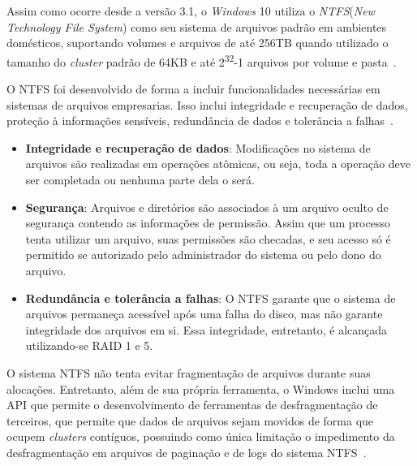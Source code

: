 Assim como ocorre desde a versão 3.1, o \emph{Windows} 10 utiliza o \emph{NTFS}(\emph{New Technology File System}) como seu sistema de arquivos padrão em ambientes domésticos, suportando volumes e arquivos de até 256TB quando utilizado o tamanho do \emph{cluster} padrão de 64KB e até 2\textsuperscript{32}-1 arquivos por volume e pasta~\cite{cluster_size}.

O NTFS foi desenvolvido de forma a incluir funcionalidades necessárias em sistemas de arquivos empresarias. Isso inclui integridade e recuperação de dados, proteção à informações sensíveis, redundância de dados e tolerância a falhas~\cite{internals_pt2}.
\begin{itemize}
	\item \textbf{Integridade e recuperação de dados}: Modificações no sistema de arquivos são realizadas em operações atômicas, ou seja, toda a operação deve ser completada ou nenhuma parte dela o será.
	\item \textbf{Segurança}: Arquivos e diretórios são associados à um arquivo oculto de segurança contendo as informações de permissão. Assim que um processo tenta utilizar um arquivo, suas permissões são checadas, e seu acesso só é permitido se autorizado pelo administrador do sistema ou pelo dono do arquivo.
	\item \textbf{Redundância e tolerância a falhas}: O NTFS garante que o sistema de arquivos permaneça acessível após uma falha do disco, mas não garante integridade dos arquivos em si. Essa integridade, entretanto, é alcançada utilizando-se RAID 1 e 5.
\end{itemize}

O sistema NTFS não tenta evitar fragmentação de arquivos durante suas alocações. Entretanto, além de sua própria ferramenta, o Windows inclui uma API que permite o desenvolvimento de ferramentas de desfragmentação de terceiros, que permite que dados de arquivos sejam movidos de forma que ocupem \emph{clusters} contíguos, possuindo como única limitação o impedimento da desfragmentação em arquivos de paginação e de logs do sistema NTFS~\cite{internals_pt2}.

